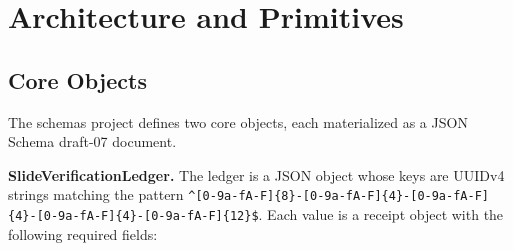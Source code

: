 
\section{Architecture and Primitives}
\label{sec:schemas-architecture}

\subsection{Core Objects}
\label{sec:schemas-architecture-objects}

The schemas project defines two core objects, each materialized as a JSON Schema draft-07 document.

\textbf{SlideVerificationLedger.} The ledger is a JSON object whose keys are UUIDv4 strings
matching the pattern \verb|^[0-9a-fA-F]{8}-[0-9a-fA-F]{4}-[0-9a-fA-F]{4}-[0-9a-fA-F]{4}-[0-9a-fA-F]{12}$|.
Each value is a receipt object with the following required fields:

